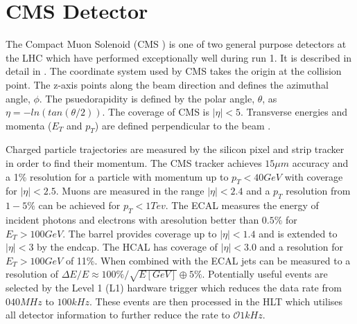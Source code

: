 \section{CMS Detector} %

The Compact Muon Solenoid (CMS \cite{CMSTDR}) is one of two general purpose detectors at the LHC which have performed exceptionally well during run 1. It is described in detail in \cite{CMS}. The coordinate system used by CMS takes the origin at the collision point. The z-axis points along the beam direction and defines the azimuthal angle, $\phi$. The psuedorapidity is defined by the polar angle, $\theta$, as $\eta=-ln(tan(\theta/2))$. The coverage of CMS is $|\eta|<5$. Transverse energies and momenta ($E_T $ and $p_T$)  are defined perpendicular to the beam \cite{cmsiop}. 

Charged particle trajectories are measured by the silicon pixel and strip tracker \cite{siliconTDR} in order to find their momentum. The CMS tracker achieves $15\mu m$ accuracy and a 1\% resolution for a particle with momentum up to $p_T < 40GeV$ with coverage for $|\eta|<2.5$. Muons are measured in the range $|\eta|<2.4$ and a $p_T$ resolution from $1-5\%$ can be achieved for $p_T < 1Tev$. The ECAL measures the energy of incident photons and electrons with aresolution better than $0.5\%$ for $E_T > 100 GeV$. The barrel provides coverage up to $|\eta| < 1.4$ and is extended to $|\eta|<3$ by the endcap. The HCAL has coverage of $|\eta|<3.0$ \cite{hcal} and a resolution for $E_T > 100GeV$ of 11\%. When combined with the ECAL jets can be measured to a resolution of $\Delta E/E \approx 100 \%/\sqrt{E[GeV]} \oplus 5\%$.
Potentially useful events are selected by the Level 1 (L1) hardware trigger which reduces the data rate from $\mathcal{0}40MHz$ to $100kHz$. These events are then processed in the HLT which utilises all detector information to further reduce the rate to $\mathcal{O}1kHz$.







